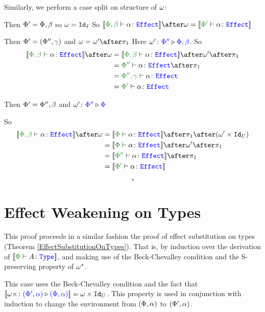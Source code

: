         Similarly, we perform a case split on structure of $\omega$:
        
        \subcase{$\w=\i$}
        Then $\Phi' = \Phi,\beta$ so $\omega=\texttt{Id}_{I}$
        So $\deno{\typerelation{\P,\b}{\a}{\effect}}\after\w = \deno{\typerelation{\P'}{\a}{\effect}}$
        
        Then $\Phi' = (\Phi'',\gamma)$ and $\w=\w'\after\p$
        Here $\omega' \colon {\color{blue}\Phi''} \triangleright {\color {blue} \Phi,\beta}$.
        So
        \begin{align*}
            \deno{\typerelation{\P,\b}{\a}{\effect}}\after\w & = \deno{\typerelation{\P,\b}{\a}{\effect}}\after\w'\after\p\\
            & = {\typerelation{\P''}{\a}{\effect}}\after\p\\
            & = {\typerelation{\P'',\g}{\a}{\effect}}\\
            & = {\typerelation{\P'}{\a}{\effect}}\\
        \end{align*}
        
        Then $\Phi'=\Phi'',\beta$ and $\omega' \colon {\color{blue}\Phi''} \triangleright {\color {blue} \Phi}$
        
        So \begin{align*}
            \deno{\typerelation{\P,\b}{\a}{\effect}}\after\w &= \deno{\typerelation{\P}{\a}{\effect}}\after\p\after(\w'\times\Id{U})\\
            &=\deno{\typerelation{\P}{\a}{\effect}}\after\w'\after\p\\
            & = \deno{\typerelation{\P''}{\a}{\effect}}\after\p\\
            & = \deno{\typerelation{\P'}{\a}{\effect}}\\
        \end{align*}
    
        $$\square$$


\section{Effect Weakening on Types}\label{AppendixEffectWeakeningOnTypes}

This proof proceeds in a similar fashion the proof of effect substitution on types (Theorem \ref{EffectSubstitutionOnTypes}). That is, by induction over the derivation of $\deno{\typerelation{\P}{A}{\type}}$, and making use of the Beck-Chevalley condition and the S-preserving property of $\omega^*$. 

\case{\tquant}
    This case uses the Beck-Chevalley condition and the fact that ${\bf [\![}\omega\times \colon {\color{blue}(\Phi', \alpha)} \triangleright {\color {blue} (\Phi,\alpha)}{\bf ]\!]} = \omega\times \texttt{Id}_{U}$. This property is used in conjunction with induction to change the environment from $(\Phi, \alpha)$ to $(\Phi', \alpha)$.

